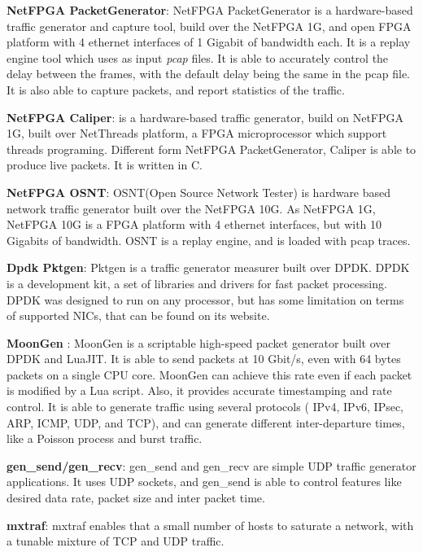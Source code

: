 \textbf{NetFPGA PacketGenerator}\cite{web-netfpgapacketgenerator}: NetFPGA PacketGenerator is a hardware-based traffic generator and capture tool, build over the NetFPGA 1G, and open FPGA platform with 4 ethernet interfaces of 1 Gigabit of bandwidth each. It is a replay engine tool which uses as input \textit{pcap} files. It is able to accurately control the delay between the frames, with the default delay being the same in the pcap file. It is also able to capture packets, and report statistics of the traffic. 


\textbf{NetFPGA Caliper}\cite{web-caliper}:  is a hardware-based traffic generator, build on NetFPGA 1G, built over NetThreads platform, a FPGA microprocessor which support threads programing. Different form NetFPGA PacketGenerator, Caliper is able to produce live packets. It is written in C. 


\textbf{NetFPGA OSNT}\cite{web-osnt}: OSNT(Open Source Network Tester) is hardware based network traffic generator built over the NetFPGA 10G. As NetFPGA 1G, NetFPGA 10G is a FPGA platform with 4 ethernet interfaces, but with 10 Gigabits of bandwidth.  OSNT is a replay engine, and is loaded with pcap traces. 


\textbf{Dpdk Pktgen}\cite{web-dpdk-pktgen}: Pktgen is a traffic generator measurer built over DPDK. DPDK is a development kit, a set of libraries and drivers for fast packet processing. DPDK was designed to run on any processor, but has some limitation on terms of supported NICs, that can be found on its website.


\textbf{MoonGen}\cite{moongen-paper}\cite{web-moongen} : MoonGen is a scriptable high-speed packet generator built over DPDK and LuaJIT. It is able to send packets at 10 Gbit/s, even with 64 bytes packets on a single CPU core. MoonGen can achieve this rate even if each packet is modified by a Lua script. Also, it provides accurate timestamping and rate control. It is able to generate traffic using several protocols ( IPv4, IPv6, IPsec, ARP, ICMP, UDP, and  TCP), and can generate different inter-departure times, like a Poisson process and burst traffic.  

\textbf{gen\_send/gen\_recv}\cite{web-gensend-genrecv}: gen\_send and gen\_recv are simple UDP traffic generator applications. It uses UDP sockets, and  gen\_send is able to control features like desired data rate, packet size and inter packet time. 


\textbf{mxtraf}\cite{web-mxtraf}: mxtraf enables that a small number of hosts to saturate a network, with a tunable mixture of TCP and UDP traffic. 

